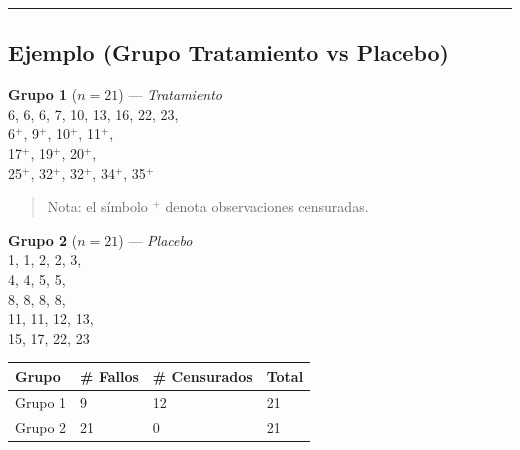 \documentclass[
]{article}
\begin{document}
\begin{center}\rule{0.5\linewidth}{0.5pt}\end{center}

\subsection{Ejemplo (Grupo Tratamiento vs
Placebo)}\label{ejemplo-grupo-tratamiento-vs-placebo}

\begin{tcolorbox}[enhanced jigsaw, rightrule=.15mm, toprule=.15mm, colback=white, bottomrule=.15mm, bottomtitle=1mm, left=2mm, leftrule=.75mm, arc=.35mm, breakable, title=\textcolor{quarto-callout-note-color}{\faInfo}\hspace{0.5em}{Ejemplo: Tiempos de remisión (semanas) para dos grupos de pacientes con
leucemia}, opacitybacktitle=0.6, colframe=quarto-callout-note-color-frame, opacityback=0, toptitle=1mm, coltitle=black, titlerule=0mm, colbacktitle=quarto-callout-note-color!10!white]

\textbf{Grupo 1} (\(n = 21\)) --- \emph{Tratamiento}\\
6, 6, 6, 7, 10, 13, 16, 22, 23,\\
6\(^+\), 9\(^+\), 10\(^+\), 11\(^+\),\\
17\(^+\), 19\(^+\), 20\(^+\),\\
25\(^+\), 32\(^+\), 32\(^+\), 34\(^+\), 35\(^+\)

\begin{quote}
Nota: el símbolo \(^+\) denota observaciones censuradas.
\end{quote}

\textbf{Grupo 2} (\(n = 21\)) --- \emph{Placebo}\\
1, 1, 2, 2, 3,\\
4, 4, 5, 5,\\
8, 8, 8, 8,\\
11, 11, 12, 13,\\
15, 17, 22, 23

\begin{longtable}[]{@{}llll@{}}
\toprule\noalign{}
Grupo & \# Fallos & \# Censurados & Total \\
\midrule\noalign{}
\endhead
\bottomrule\noalign{}
\endlastfoot
Grupo 1 & 9 & 12 & 21 \\
Grupo 2 & 21 & 0 & 21 \\
\end{longtable}

\end{tcolorbox}
\end{document}
